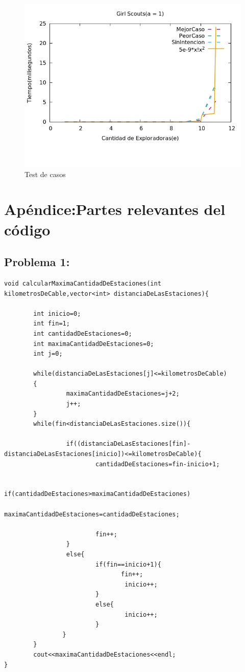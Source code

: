 \documentclass[10pt, a4paper]{article}
\begin{document}
\begin{figure}[H]
  		\centering
   	 	\includegraphics[width=1\textwidth]
   	 	{Imagenes/graph.png}
		\caption{Test de casos}
	\end{figure}		

\section{Apéndice:Partes relevantes del código}

\subsection{Problema 1:}
\begin{verbatim}
void calcularMaximaCantidadDeEstaciones(int kilometrosDeCable,vector<int> distanciaDeLasEstaciones){
	    
	    int inicio=0;
	    int fin=1;
	    int cantidadDeEstaciones=0;
	    int maximaCantidadDeEstaciones=0;
	    int j=0;
	    
	    while(distanciaDeLasEstaciones[j]<=kilometrosDeCable)
	    {
		         maximaCantidadDeEstaciones=j+2;
		         j++;
	    }
	    while(fin<distanciaDeLasEstaciones.size()){
	     
		         if((distanciaDeLasEstaciones[fin]-distanciaDeLasEstaciones[inicio])<=kilometrosDeCable){
			             cantidadDeEstaciones=fin-inicio+1;
			             
			             if(cantidadDeEstaciones>maximaCantidadDeEstaciones)
				                 maximaCantidadDeEstaciones=cantidadDeEstaciones;
			
			             fin++;
		         }
		         else{
			             if(fin==inicio+1){
			                	fin++;
				                 inicio++;
			             }
			             else{
				                 inicio++;
			             }
		        }
	    }
	    cout<<maximaCantidadDeEstaciones<<endl;
}
\end{verbatim}
\end{document}
